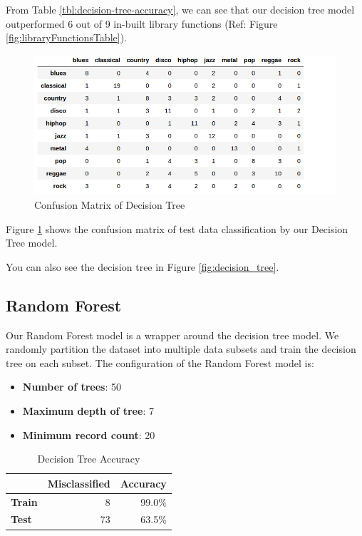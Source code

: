 \documentclass[a4paper,10pt]{article}
\begin{document}
From Table \ref{tbl:decision-tree-accuracy}, we can see that our decision tree model outperformed 6 out of 9 in-built library functions (Ref: Figure \ref{fig:libraryFunctionsTable}).

\begin{figure}[!ht]
    \centering
    \includegraphics[scale=0.5]{decision_cmtx_testdata.png}
    \caption{Confusion Matrix of Decision Tree}
    \label{fig:dt-cmtx-test}
\end{figure}

Figure \ref{fig:dt-cmtx-test} shows the confusion matrix of test data classification by our Decision Tree model.

You can also see the decision tree in Figure \ref{fig:decision_tree}.

\subsection{Random Forest}
Our Random Forest model is a wrapper around the decision tree model. We randomly partition the dataset into multiple data subsets and train the decision tree on each subset.
The configuration of the Random Forest model is:
\begin{itemize}
 \item \textbf{Number of trees}: 50
  \item \textbf{Maximum depth of tree}: 7
 \item \textbf{Minimum record count}: 20
\end{itemize}

\begin{table}[ht]
    \centering
    \caption{Decision Tree Accuracy}
    \label{tbl:random-forest-accuracy}
    \begin{tabular}{|l|r|r|}
    \hline
                   & \textbf{Misclassified} & \textbf{Accuracy} \\ \hline
    \textbf{Train} & 8                      & 99.0\%            \\ \hline
    \textbf{Test}  & 73                     & 63.5\%            \\ \hline
    \end{tabular}
\end{table}
\end{document}
